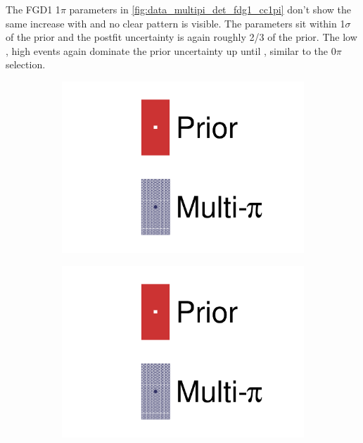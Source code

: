 The FGD1 1$\pi$ parameters in \autoref{fig:data_multipi_det_fdg1_cc1pi} don't show the same increase with \pmu and no clear pattern is visible. The parameters sit within 1$\sigma$ of the prior and the postfit uncertainty is again roughly 2/3 of the prior. The low \cosmu, high \pmu events again dominate the prior uncertainty up until , similar to the 0$\pi$ selection.
\begin{figure}[h]
	\centering
	\begin{subfigure}[t]{0.32\textwidth}
		\includegraphics[width=\textwidth,page=28, trim={0mm 0mm 0mm 0mm}, clip]{figures/mach3/2018/data/2018a_FixedCov_RedCov_Mpi_Data_merge_drawPar_withDet}
	\end{subfigure}
	\begin{subfigure}[t]{0.32\textwidth}
		\includegraphics[width=\textwidth,page=29, trim={0mm 0mm 0mm 0mm}, clip]{figures/mach3/2018/data/2018a_FixedCov_RedCov_Mpi_Data_merge_drawPar_withDet}

\end{subfigure}
\end{figure}
